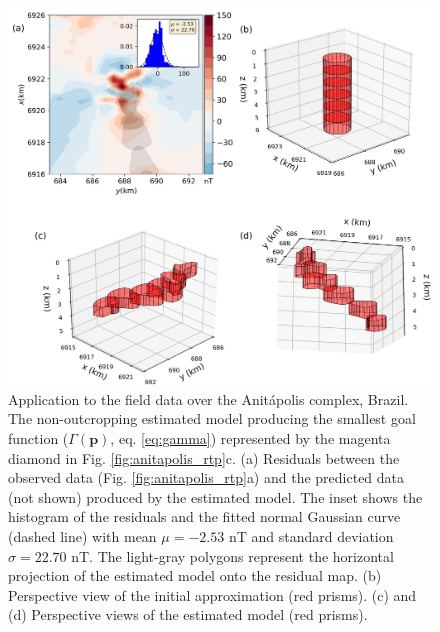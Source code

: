 \begin{figure}
	\centering
	\includegraphics[width=\linewidth]{figures/real_results_magenta_diamond.png}
	\caption{Application to the field data over the Anit{\'a}polis complex, Brazil.
	The non-outcropping estimated model producing the smallest goal function 
	($ \Gamma(\mathbf{p})$, eq. \ref{eq:gamma})	represented by the magenta diamond 
	in Fig. \ref{fig:anitapolis_rtp}c.
	(a) Residuals between the observed data (Fig. \ref{fig:anitapolis_rtp}a) and the 
	predicted data (not shown) produced by the estimated model. 
	The inset shows the histogram of the residuals and the fitted normal 
	Gaussian curve (dashed line) with mean $\mu = -2.53$ nT and 
	standard deviation $\sigma = 22.70$ nT.
	The light-gray polygons represent the horizontal projection of the estimated 
	model onto the residual map. 
	(b) Perspective view of the initial approximation (red prisms). 
	(c) and (d) Perspective views of the estimated model (red prisms).}
	\label{fig:real_result2}
\end{figure}

